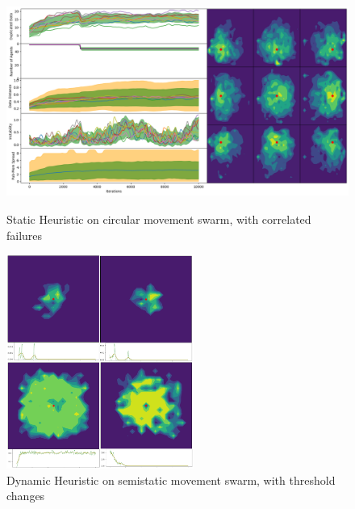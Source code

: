 \documentclass{UoYCSproject}
\begin{document}
\begin{figure}[htb]
\label{fig:circle_movement_con}
\begin{center}
\centering
\includegraphics[height=7cm]{"./Static_Heuristic/Circle_movement_concurrent.png"}
\caption{Static Heuristic on circular movement swarm, with correlated failures}
\end{center}
\end{figure}


\begin{figure}[htb]
\label{fig:Threshold_Changes2}
\begin{center}
\centering
\includegraphics[height=7cm]{"./Dynamic_Heuristic/Thresholdchanges.png"}
\caption{Dynamic Heuristic on semi\-static movement swarm, with threshold changes}
\end{center}
\end{figure}
\end{document}
